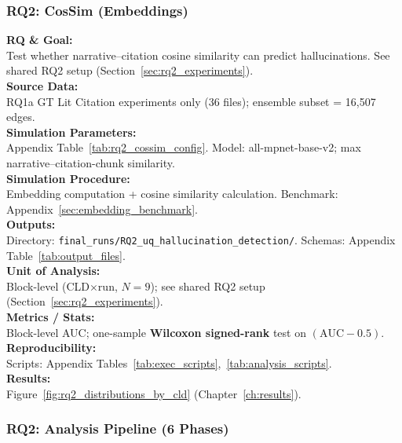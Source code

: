 \subsubsection{RQ2: CosSim (Embeddings)}
\label{sec:rq2_cossim_embeddings}

\textbf{RQ \& Goal:}\\
Test whether narrative--citation cosine similarity can predict hallucinations. See shared RQ2 setup (Section~\ref{sec:rq2_experiments}).\\
\textbf{Source Data:}\\
RQ1a GT Lit Citation experiments only (36 files); ensemble subset = 16,507 edges.\\
\textbf{Simulation Parameters:}\\
Appendix Table~\ref{tab:rq2_cossim_config}. Model: all-mpnet-base-v2; max narrative--citation-chunk similarity.\\
\textbf{Simulation Procedure:}\\
Embedding computation + cosine similarity calculation. Benchmark: Appendix~\ref{sec:embedding_benchmark}.\\
\textbf{Outputs:}\\
Directory: \texttt{final\_runs/RQ2\_uq\_hallucination\_detection/}. Schemas: Appendix Table~\ref{tab:output_files}.\\
\textbf{Unit of Analysis:}\\
Block-level (CLD$\times$run, $N=9$); see shared RQ2 setup (Section~\ref{sec:rq2_experiments}).\\
\textbf{Metrics / Stats:}\\
Block-level AUC; one-sample \textbf{Wilcoxon signed-rank} test on $(\mathrm{AUC}-0.5)$.\\
\textbf{Reproducibility:}\\
Scripts: Appendix Tables~\ref{tab:exec_scripts},~\ref{tab:analysis_scripts}.\\
\textbf{Results:}\\
Figure~\ref{fig:rq2_distributions_by_cld} (Chapter~\ref{ch:results}).

\subsubsection{RQ2: Analysis Pipeline (6 Phases)}
\label{sec:rq2_analysis}

